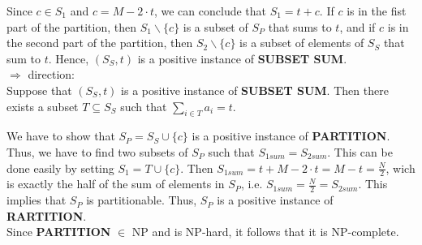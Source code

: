 \noindent Since $c\in S_1$ and $c=M-2\cdot t$, we can conclude that $S_1=t+c$. If $c$
is in the fist part of the partition, then $S_1\backslash \{c\}$ is a subset
of $S_P$ that sums to $t$, and if $c$ is in the second part of the partition,
then $S_2\backslash \{c\}$ is a subset of elements of $S_S$ that sum to $t$.
Hence, $(S_S,t)$ is a positive instance of \textbf{SUBSET SUM}.\\

\noindent $\Rightarrow$ direction:\\
Suppose that $(S_S,t)$ is a positive instance of 
\textbf{SUBSET SUM}. Then there exists a subset $T\subseteq S_S$ such that 
$\sum \limits_{i\in T} a_{i}=t$.

\noindent We have to show that $S_P=S_S\cup \{c\}$ is a positive instance of 
\textbf{PARTITION}. Thus, we have to find two subsets of $S_P$
such that $S_{1sum}=S_{2sum}$. This can be done easily by setting $S_1=T\cup \{c\}$.
Then $S_{1sum}=t+M-2\cdot t=M-t=\frac{N}{2}$, wich is exactly the half of the
sum of elements in $S_P$, i.e. $S_{1sum}=\frac{N}{2}=S_{2sum}$. This
implies that $S_P$ is partitionable. Thus, $S_P$ is a
positive instance of \textbf{RARTITION}.\\


\noindent Since \textbf{PARTITION} $\in $ NP and is NP-hard, it follows that it is
NP-complete.
